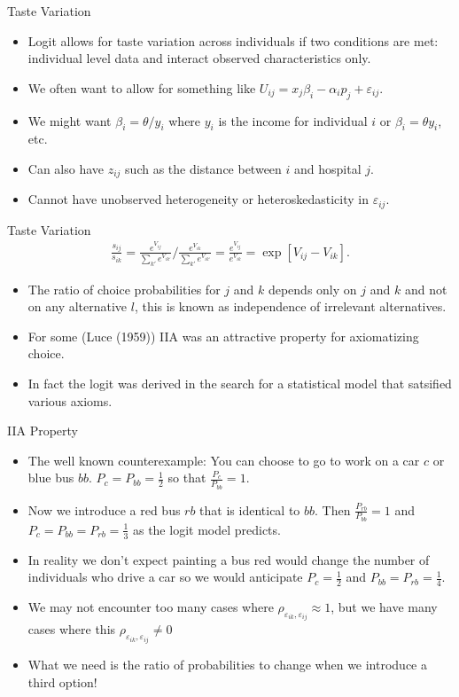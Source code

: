 \documentclass[xcolor=pdftex,dvipsnames,table,mathserif]{beamer}
\begin{document}
\begin{frame}{Taste Variation}
\begin{itemize}
\item Logit allows for taste variation across individuals if two conditions are met: \alert{individual level data} and \alert{interact observed characteristics} only.
\item We often want to allow for something like $U_{ij} = x_{j} \beta_i - \alpha_i p_j + \varepsilon_{ij}$. 
\item We might want $\beta_i = \theta / y_i$ where $y_i$ is the income for individual $i$ or $\beta_i = \theta y_i$, etc.
\item Can also have $z_{ij}$ such as the distance between $i$ and hospital $j$.
\item Cannot have unobserved heterogeneity or heteroskedasticity in $\varepsilon_{ij}$.
\end{itemize}
\end{frame}

\begin{frame}{Taste Variation}
\begin{eqnarray*}
\frac{s_{ij}}{s_{ik}} = \frac{e^{V_{ij}}}{\sum_{k'} e^{V_{ik'}}} / \frac{e^{V_{ik}}}{\sum_{k'} e^{V_{ik'}}} = \frac{e^{V_{ij}}}{e^{V_{ik}}} = \exp[V_{ij} - V_{ik}].
\end{eqnarray*}
\begin{itemize}
\item The ratio of choice probabilities for $j$ and $k$ depends only on $j$ and $k$ and not on any alternative $l$, this is known as \alert{independence of irrelevant alternatives}.
\item For some (Luce (1959)) IIA was an attractive property for axiomatizing choice.
\item In fact the logit was derived in the search for a statistical model that satsified various axioms.
\end{itemize}
\end{frame}

\begin{frame}{IIA Property}
\begin{itemize}
\item The well known counterexample: You can choose to go to work on a car $c$ or blue bus $bb$. $P_{c} = P_{bb} = \frac{1}{2}$ so that $\frac{P_c}{P_{bb}} = 1$.
\item Now we introduce a red bus $rb$ that is identical to $bb$. Then $\frac{P_{rb}}{P_{bb}} = 1$ and $P_{c} = P_{bb}= P_{rb} = \frac{1}{3}$ as the logit model predicts.
\item In reality we don't expect painting a bus red would change the number of individuals who drive a car so we would anticipate $P_{c} = \frac{1}{2}$ and $P_{bb} = P_{rb} = \frac{1}{4}$.
\item We may not encounter too many cases where $\rho_{\varepsilon_{ik},\varepsilon_{ij}} \approx 1$, but we have many cases where this $\rho_{\varepsilon_{ik},\varepsilon_{ij}} \neq 0$
\item What we need is the ratio of probabilities to change when we introduce a third option!
\end{itemize}
\end{frame}
\end{document}
